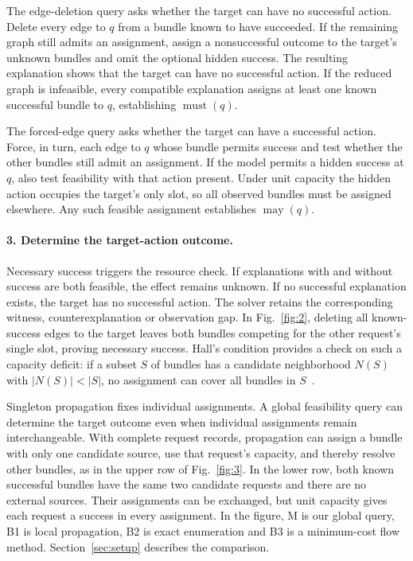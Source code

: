The edge-deletion query asks whether the target can have no successful action. Delete every edge to $q$ from a bundle known to have succeeded. If the remaining graph still admits an assignment, assign a nonsuccessful outcome to the target's unknown bundles and omit the optional hidden success. The resulting explanation shows that the target can have no successful action. If the reduced graph is infeasible, every compatible explanation assigns at least one known successful bundle to $q$, establishing $\operatorname{must}(q)$.

The forced-edge query asks whether the target can have a successful action. Force, in turn, each edge to $q$ whose bundle permits success and test whether the other bundles still admit an assignment. If the model permits a hidden success at $q$, also test feasibility with that action present. Under unit capacity the hidden action occupies the target's only slot, so all observed bundles must be assigned elsewhere. Any such feasible assignment establishes $\operatorname{may}(q)$.

\paragraph{3. Determine the target-action outcome.}
Necessary success triggers the resource check. If explanations with and without success are both feasible, the effect remains unknown. If no successful explanation exists, the target has no successful action. The solver retains the corresponding witness, counterexplanation or observation gap. In Fig.~\ref{fig:2}, deleting all known-success edges to the target leaves both bundles competing for the other request's single slot, proving necessary success. Hall's condition provides a check on such a capacity deficit: if a subset $S$ of bundles has a candidate neighborhood $N(S)$ with $|N(S)|<|S|$, no assignment can cover all bundles in $S$~\citep{r41}.

Singleton propagation fixes individual assignments. A global feasibility query can determine the target outcome even when individual assignments remain interchangeable. With complete request records, propagation can assign a bundle with only one candidate source, use that request's capacity, and thereby resolve other bundles, as in the upper row of Fig.~\ref{fig:3}. In the lower row, both known successful bundles have the same two candidate requests and there are no external sources. Their assignments can be exchanged, but unit capacity gives each request a success in every assignment. In the figure, M is our global query, B1 is local propagation, B2 is exact enumeration and B3 is a minimum-cost flow method. Section~\ref{sec:setup} describes the comparison.

